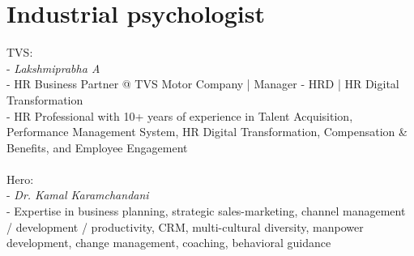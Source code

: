\section{Industrial psychologist}
TVS:\\
- \textit{Lakshmiprabha A}\\
- HR Business Partner @ TVS Motor Company | Manager - HRD | HR Digital Transformation\\
- HR Professional with 10+ years of experience in Talent Acquisition, Performance Management System, HR Digital Transformation, Compensation \& Benefits, and Employee Engagement\\\\
Hero:\\
- \textit{Dr. Kamal Karamchandani}\\
- Expertise in business planning, strategic sales-marketing, channel management / development / productivity, CRM, multi-cultural diversity, manpower development, change management, coaching, behavioral guidance